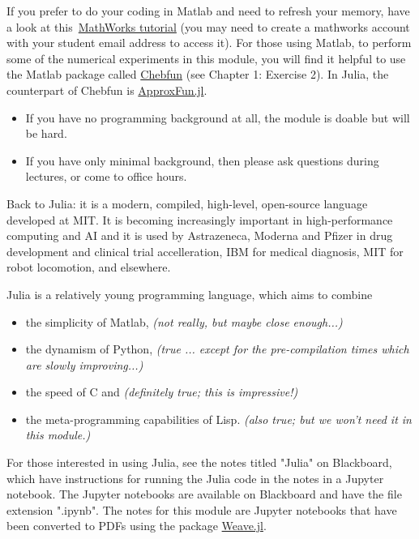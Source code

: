 \documentclass[12pt,landscape]{article}
\begin{document}
{If you prefer to do your coding in Matlab and need to refresh your memory, have a look at this \href{https://matlabacademy.mathworks.com/details/matlab-onramp/gettingstarted}{MathWorks tutorial} (you may need to create a mathworks account with your student email address to access it).  For those using Matlab, to perform some of the numerical experiments in this module, you will find it helpful to use the Matlab package called \href{https://www.chebfun.org/}{Chebfun} (see Chapter 1: Exercise 2).  In Julia, the counterpart of Chebfun is \href{https://github.com/JuliaApproximation/ApproxFun.jl}{ApproxFun.jl}. 

\begin{itemize}
\item If you have no programming background at all, the module is doable but will be hard. 


\item If you have only minimal background, then please ask questions during lectures, or come to office hours.

\end{itemize}
Back to Julia: it is a modern, compiled, high-level, open-source language developed at MIT. It is becoming increasingly important in high-performance computing and AI and it is used by Astrazeneca, Moderna and Pfizer in drug development and clinical trial accelleration, IBM for medical diagnosis, MIT for robot locomotion, and elsewhere.

Julia is a relatively young programming language, which aims to combine 

\begin{itemize}
\item the simplicity of Matlab,   \emph{(not really, but maybe close enough...)}


\item the dynamism of Python,   \emph{(true ... except for the pre-compilation times which are slowly improving...)}


\item the speed of C and   \emph{(definitely true; this is impressive!)}


\item the meta-programming capabilities of Lisp.   \emph{(also true; but we won't need it in this module.)}

\end{itemize}
For those interested in using Julia, see the notes titled "Julia" on Blackboard, which have instructions for running the Julia code in the notes in a Jupyter notebook.  The Jupyter notebooks are available on Blackboard and have the file extension ".ipynb".  The notes for this module are Jupyter notebooks that have been converted to PDFs using the package \href{https://github.com/JunoLab/Weave.jl}{Weave.jl}.

}
\end{document}
